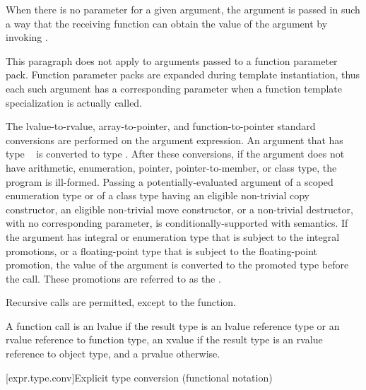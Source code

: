 \pnum
{}%
When there is no parameter for a given argument, the argument is passed
in such a way that the receiving function can obtain the value of the
argument by invoking .
\begin{note}
This paragraph does not apply to arguments passed to a function parameter pack.
Function parameter packs are expanded during template instantiation,
thus each such argument has a corresponding parameter when a function template
specialization is actually called.
\end{note}
The
lvalue-to-rvalue, array-to-pointer,
and function-to-pointer standard conversions are
performed on the argument expression.
An argument that has type \cv{}~ is converted
to type .
After these conversions, if the
argument does not have arithmetic, enumeration, pointer, pointer-to-member,
or class type, the program is ill-formed. Passing a potentially-evaluated
argument
of a scoped enumeration type or
of a class type having an eligible non-trivial
copy constructor, an eligible non-trivial move constructor,
or a
non-trivial destructor,
with no corresponding parameter, is conditionally-supported with
 semantics. If the argument has
integral or enumeration type that is subject to the integral
promotions, or a floating-point type that is subject to the
floating-point promotion, the value of the argument is converted to the
promoted type before the call. These promotions are referred to as
the .

\pnum
{}%
Recursive calls are permitted, except to the 
function.

\pnum
A function call is an lvalue
if the result type is an lvalue reference type or an rvalue reference to function type,
an xvalue if the result type is an rvalue reference to object type, and a prvalue
otherwise.

[expr.type.conv]{Explicit type conversion (functional notation)}

